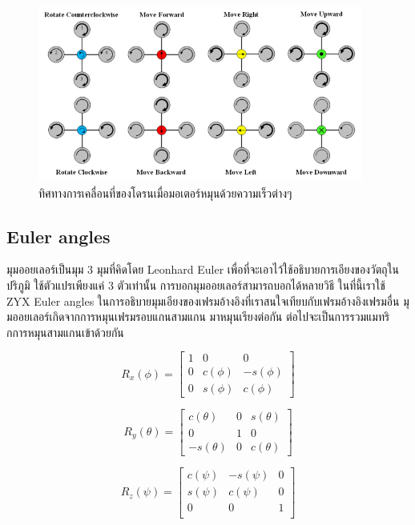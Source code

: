 \documentclass{classes/fiboReport}
\begin{document}
\begin{figure}[ht]
	\centering
	\includegraphics[width=0.95\textwidth]{images/Quadcopter_Movement.png}
	\caption{ทิศทางการเคลื่อนที่ของโดรนเมื่อมอเตอร์หมุนด้วยความเร็วต่างๆ}
	\label{fig:quadroter_movement}
\end{figure}
\clearpage
\subsection{Euler angles}
มุมออยเลอร์เป็นมุม 3 มุมที่คิดโดย Leonhard Euler เพื่อที่จะเอาไว้ใช้อธิบายการเอียงของวัตถุในปริภูมิ
ใช้ตัวแปรเพียงแค่ 3 ตัวเท่านั้น การบอกมุมออยเลอร์สามารถบอกได้หลายวิธี ในที่นี้เราใช้ ZYX Euler angles
ในการอธิบายมุมเอียงของเฟรมอ้างอิงที่เราสนใจเทียบกับเฟรมอ้างอิงเฟรมอื่น มุมออยเลอร์เกิดจากการหมุนเฟรมรอบแกนสามแกน
มาหมุนเรียงต่อกัน ต่อไปจะเป็นการรวมแมทริกการหมุนสามแกนเข้าด้วยกัน

\begin{equation}
	{R_{x}(\phi) = \begin{bmatrix}
		1 & 0 & 0 \\
		0 & c(\phi) & -s(\phi) \\
		0 & s(\phi) & c(\phi)
		\end{bmatrix}}
	\label{equ:rotation_matrix_x}
\end{equation}

\begin{equation}
	{R_{y}(\theta) = \begin{bmatrix}
		c(\theta) & 0 & s(\theta) \\
		0 & 1 & 0 \\
		-s(\theta) & 0 & c(\theta)
		\end{bmatrix}}
	\label{equ:rotation_matrix_y}
\end{equation}

\begin{equation}
	{R_{z}(\psi) = \begin{bmatrix}
		c(\psi) & -s(\psi) & 0 \\
		s(\psi) & c(\psi) & 0 \\
		0 & 0 & 1 \\
		\end{bmatrix}}
	\label{equ:rotation_matrix_z}
\end{equation}
\end{document}
